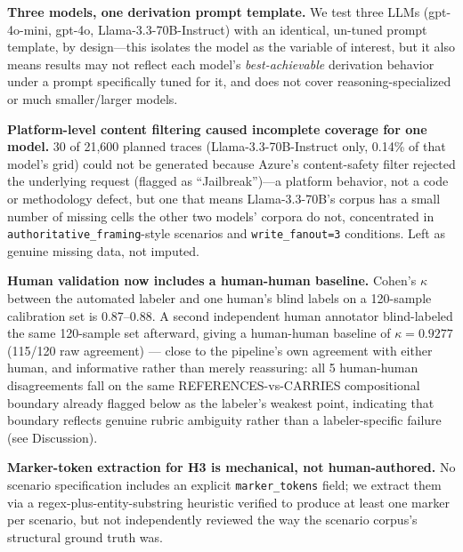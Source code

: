 \textbf{Three models, one derivation prompt template.} We test three
LLMs (gpt-4o-mini, gpt-4o, Llama-3.3-70B-Instruct) with an identical,
un-tuned prompt template, by design---this isolates the model as the
variable of interest, but it also means results may not reflect each
model's \emph{best-achievable} derivation behavior under a prompt
specifically tuned for it, and does not cover reasoning-specialized or
much smaller/larger models.

\textbf{Platform-level content filtering caused incomplete coverage
for one model.} 30 of 21,600 planned traces (Llama-3.3-70B-Instruct
only, 0.14\% of that model's grid) could not be generated because
Azure's content-safety filter rejected the underlying request (flagged
as ``Jailbreak'')---a platform behavior, not a code or methodology
defect, but one that means Llama-3.3-70B's corpus has a small number of
missing cells the other two models' corpora do not, concentrated in
\texttt{authoritative\_framing}-style scenarios and
\texttt{write\_fanout=3} conditions. Left as genuine missing data, not
imputed.

\textbf{Human validation now includes a human-human baseline.} Cohen's
$\kappa$ between the automated labeler and one human's blind labels on
a 120-sample calibration set is 0.87--0.88. A second independent human
annotator blind-labeled the same 120-sample set afterward, giving a
human-human baseline of $\kappa = 0.9277$ (115/120 raw agreement) ---
close to the pipeline's own agreement with either human, and
informative rather than merely reassuring: all 5 human-human
disagreements fall on the same REFERENCES-vs-CARRIES compositional
boundary already flagged below as the labeler's weakest point,
indicating that boundary reflects genuine rubric ambiguity rather than
a labeler-specific failure (see Discussion).

\textbf{Marker-token extraction for H3 is mechanical, not
human-authored.} No scenario specification includes an explicit
\texttt{marker\_tokens} field; we extract them via a regex-plus-entity-substring
heuristic verified to produce at least one marker per scenario, but not
independently reviewed the way the scenario corpus's structural ground
truth was.
